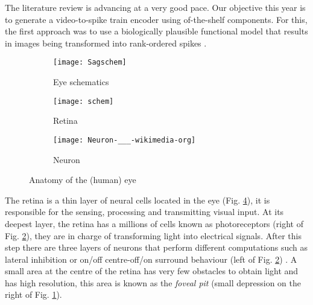 The literature review is advancing at a very good pace. Our objective this year 
is to generate a video-to-spike train encoder using of-the-shelf components. 
For this, the first approach was to use a biologically plausible functional 
model \cite{basab-model} that results in images being transformed into 
rank-ordered spikes \cite{thorpe-spike-rapid-processing}.

\begin{figure}[hbt]
  \centering
  \begin{subfigure}[b]{0.15\textwidth}
    \centering
    \texttt{[image: Sagschem]}
    \caption{Eye schematics}
    \label{sub-fig-eye-schematics}
  \end{subfigure}
  \begin{subfigure}[b]{0.15\textwidth}
    \centering
    \texttt{[image: schem]}
    \caption{Retina}
    \label{sub-fig-retinal-layers}
  \end{subfigure}
  \begin{subfigure}[b]{0.15\textwidth}
    \centering
    \texttt{[image: Neuron-\_\_\_-wikimedia-org]}
    \caption{Neuron}
    \label{sub-fig-neuron}
  \end{subfigure}
  
  \caption{Anatomy of the (human) eye }
  \label{fig-basic-eye-anatomy}
\end{figure}

The retina is a thin layer of neural cells located in the eye (Fig. 
\ref{fig-basic-eye-anatomy}), it is responsible
for the sensing, processing and transmitting visual input\cite{webvision}. 
At its deepest layer, the retina has a millions of cells known as 
photoreceptors (right of Fig. \ref{sub-fig-retinal-layers}), they are in charge 
of transforming light into electrical 
signals. After this step there are three layers of neurons that 
perform different computations such as lateral inhibition or on/off 
centre-off/on surround behaviour (left of Fig. \ref{sub-fig-retinal-layers})
\cite{webvision, basab-model}. A small area 
at the centre of the retina has very few obstacles to obtain light and has high
resolution, this area is known as the \emph{foveal pit} (small depression on 
the right of Fig. \ref{sub-fig-eye-schematics}).

